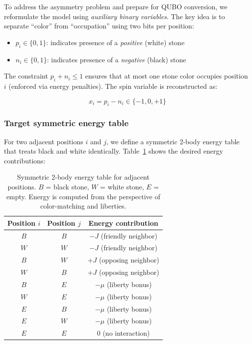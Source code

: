 \documentclass[aps,prl,reprint]{revtex4-2}
\begin{document}
To address the asymmetry problem and prepare for QUBO conversion, we reformulate the model using \textit{auxiliary binary variables}. The key idea is to separate ``color'' from ``occupation'' using two bits per position:

\begin{itemize}
	\item $p_i \in \{0,1\}$: indicates presence of a \textit{positive} (white) stone
	\item $n_i \in \{0,1\}$: indicates presence of a \textit{negative} (black) stone
\end{itemize}

The constraint $p_i + n_i \leq 1$ ensures that at most one stone color occupies position $i$ (enforced via energy penalties). The spin variable is reconstructed as:

\begin{equation}
x_i = p_i - n_i \in \{-1, 0, +1\}
\end{equation}

\subsubsection{Target symmetric energy table}

For two adjacent positions $i$ and $j$, we define a symmetric 2-body energy table that treats black and white identically. Table~\ref{tab:symmetric_energy} shows the desired energy contributions:

\begin{table}[h]
	\centering
	\caption{Symmetric 2-body energy table for adjacent positions. $B$ = black stone, $W$ = white stone, $E$ = empty. Energy is computed from the perspective of color-matching and liberties.}
	\label{tab:symmetric_energy}
	\begin{tabular}{|c|c|c|}
		\hline
		Position $i$ & Position $j$ & Energy contribution \\
		\hline
		$B$ & $B$ & $-J$ (friendly neighbor) \\
		$W$ & $W$ & $-J$ (friendly neighbor) \\
		$B$ & $W$ & $+J$ (opposing neighbor) \\
		$W$ & $B$ & $+J$ (opposing neighbor) \\
		$B$ & $E$ & $-\mu$ (liberty bonus) \\
		$W$ & $E$ & $-\mu$ (liberty bonus) \\
		$E$ & $B$ & $-\mu$ (liberty bonus) \\
		$E$ & $W$ & $-\mu$ (liberty bonus) \\
		$E$ & $E$ & $0$ (no interaction) \\
		\hline
	\end{tabular}
\end{table}
\end{document}
